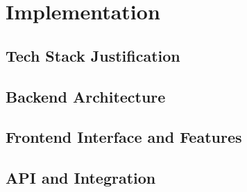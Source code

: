 \chapter{Implementation}
\section{Tech Stack Justification}
\section{Backend Architecture}
\section{Frontend Interface and Features}
\section{API and Integration}
